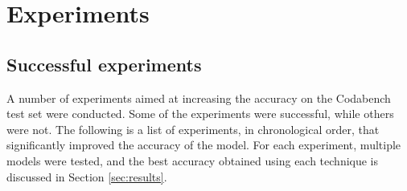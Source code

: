 \documentclass[11pt]{article}
\begin{document}
\begin{multicols}{2}
      \label{sec:experiments}
      \section{Experiments}


      \subsection{Successful experiments}

      A number of experiments aimed at increasing the accuracy on the Codabench test
      set were conducted. Some of the experiments were successful, while others were not. 
      The following is a list of experiments, in chronological order, that significantly
      improved the accuracy of the model. For each experiment, multiple models were tested,
      and the best accuracy obtained using each technique is discussed in Section 
      \ref{sec:results}.


\end{multicols}
\end{document}
